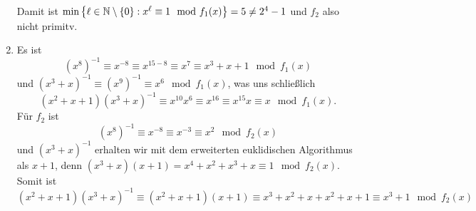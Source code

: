 \documentclass[ngerman, a4paper, 11pt]{article}
\theoremstyle{plain}
\theoremstyle{plain}
\theoremstyle{proofstyle}
\begin{document}
\begin{exercisePage}
\begin{enumerate}[label=(zu \alph*), leftmargin=*]
		Damit ist $\min\left\{ \ell \in \mathbb{N} \setminus \left\{ 0 \right\} : x^\ell \equiv 1 \mod f_1(x) \right\} = 5 \neq 2^4-1$ und $f_2$ also nicht primitv.
		
		\item Es ist
		\begin{equation*}
			(x^8)^{-1} \equiv x^{-8} \equiv x^{15-8} \equiv x^7 \equiv x^3 + x + 1 \mod f_1(x)
		\end{equation*} 
		und $(x^3+x)^{-1} \equiv (x^9)^{-1} \equiv x^6 \mod f_1(x)$, was uns schließlich 
		\begin{equation*}
			(x^2+x+1)(x^3+x)^{-1} \equiv x^{10} x^6 \equiv x^{16} \equiv x^{15} x \equiv x \mod f_1(x).
		\end{equation*}
		Für $f_2$ ist 
		\begin{equation*}
			(x^8)^{-1} \equiv x^{-8} \equiv x^{-3} \equiv x^2 \mod f_2(x) 
		\end{equation*}
		und $(x^3 + x)^{-1}$ erhalten wir mit dem erweiterten euklidischen Algorithmus als $x+1$, denn $(x^3+x)(x+1) = x^4+x^2+x^3+x \equiv 1 \mod f_2(x)$. Somit ist
		\begin{equation*}
			(x^2+x+1)(x^3+x)^{-1} 
			\equiv (x^2+x+1)(x+1)
			\equiv x^3 + x^2 + x + x^2 + x +1 \equiv x^3 + 1 \mod f_2(x)
		\end{equation*}
	\end{enumerate}
	
\end{exercisePage}
\end{document}
